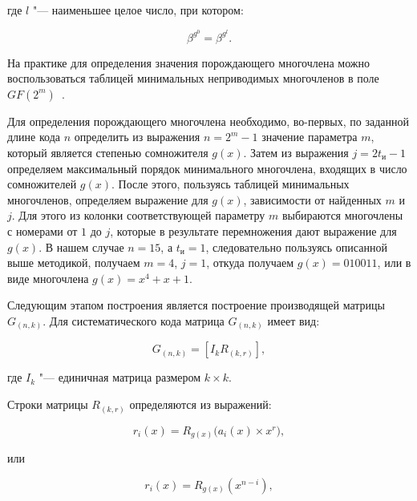 \begin{ESKDexplanation}
\item[где ] $l$ "--- наименьшее целое число, при котором:
\end{ESKDexplanation}

\begin{equation*}
  \beta^{g^0} = \beta^{g^l}.
\end{equation*}

На практике для определения значения порождающего многочлена можно
воспользоваться таблицей минимальных неприводимых многочленов в поле
$GF(2^m)$~\cite{Spero}.

Для определения порождающего многочлена необходимо, во-первых, по
заданной длине кода $n$ определить из выражения $n = 2^m - 1$ значение
параметра $m$, который является степенью сомножителя $g(x)$. Затем из
выражения $j = 2t_{\text{и}} - 1$ определяем максимальный порядок
минимального многочлена, входящих в число сомножителей $g(x)$. После
этого, пользуясь таблицей минимальных многочленов, определяем
выражение для $g(x)$, зависимости от найденных $m$ и $j$. Для этого из
колонки соответствующей параметру $m$ выбираются многочлены с номерами
от $1$ до $j$, которые в результате перемножения дают выражение для
$g(x)$. В нашем случае $n = 15$, а $t_{\text{и}} = 1$, следовательно
пользуясь описанной выше методикой, получаем $m = 4$, $j = 1$, откуда
получаем $g(x)=010011$, или в виде многочлена $g(x)=x^4 + x + 1$.

Следующим этапом построения является построение производящей матрицы
$G_{(n,k)}$. Для систематического кода матрица $G_{(n, k)}$ имеет вид:

\begin{equation*}
  G_{(n,k)} = \left[I_k R_{(k, r)} \right],
\end{equation*}

\begin{ESKDexplanation}
\item[где ] $I_k$ "--- единичная матрица размером $k \times k$.
\end{ESKDexplanation}

Строки матрицы $R_{(k, r)}$ определяются из выражений:

\begin{equation}
\label{r_i(x)}
r_i(x) = R_{g(x)}\bigl(a_i(x) \times x^r \bigr),
\end{equation}

или

\begin{equation*}
r_i(x) = R_{g(x)}\left(x^{n-i} \right),
\end{equation*}

